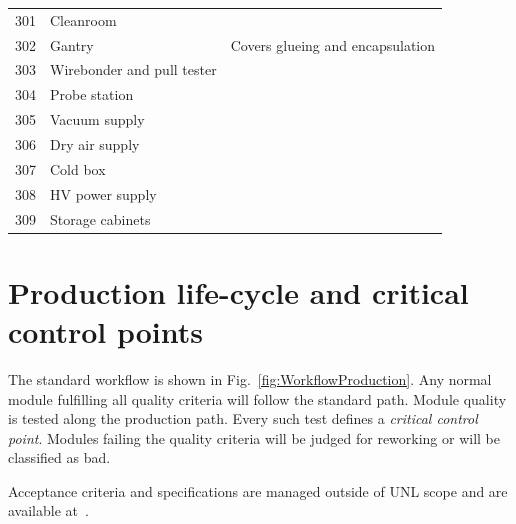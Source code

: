\documentclass[12pt]{unlsilabsop}
\begin{document}
\begin{table}[hH]
\begin{center}
{\begin{tabular}{lp{7cm}p{6cm}}
\midrule
301 & Cleanroom & \\
302 & Gantry & Covers glueing and encapsulation \\
303 & Wirebonder and pull tester & \\
304 & Probe station & \\
305 & Vacuum supply & \\
306 & Dry air supply & \\
307 & Cold box & \\
308 & HV power supply & \\
309 & Storage cabinets & \\
\bottomrule
\end{tabular}
}
\end{center}
\end{table}


\section{Production life-cycle and critical control points}

The standard workflow is shown in Fig.~\ref{fig:WorkflowProduction}. Any normal module fulfilling all quality criteria will follow the standard path. Module quality is tested along the production path. Every such test defines a \emph{critical control point}. Modules failing the quality criteria will be judged for reworking or will be classified as bad.

Acceptance criteria and specifications are managed outside of UNL scope and are available at~\cite{FPixSpec}.
\end{document}
